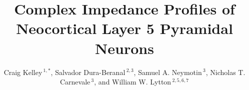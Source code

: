 \documentclass[utf8]{frontiersSCNS} %
\def\firstAuthorLast{Sample {et~al.}} %
\def\Authors{Craig Kelley\,$^{1,*}$, Salvador Dura-Beranal\,$^{2,3}$, Samuel A. Neymotin\,$^{3}$, Nicholas T. Carnevale\,$^{3}$, and William W. Lytton\,$^{2,5,6,7}$}
\begin{document}
\onecolumn
{}

\title[Running Title]{Complex Impedance Profiles of Neocortical Layer 5 Pyramidal Neurons} 

\author[\firstAuthorLast ]{\Authors} %
\address{} %
\correspondance{} %

\extraAuth{}%
    

\maketitle
\end{document}
